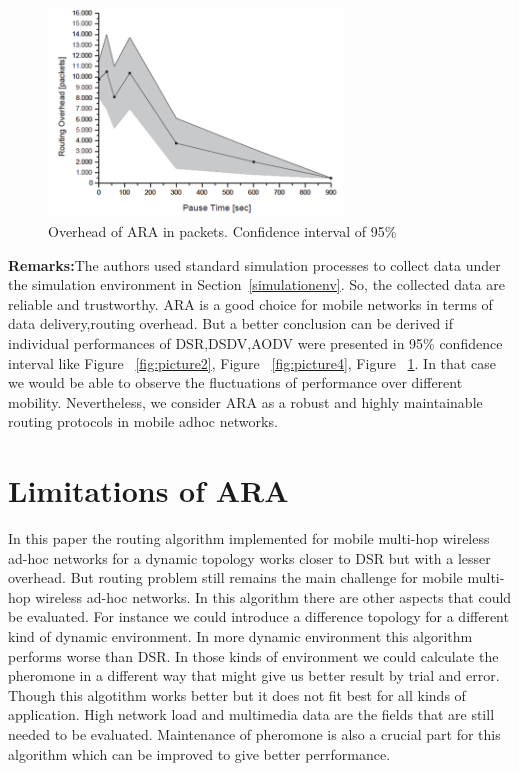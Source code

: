 \begin{figure}[t!]
\centering
\includegraphics[width=0.7\textwidth]{Picture6.png}
\caption{\label{fig:picture6}Overhead of ARA in packets. Confidence interval of 95\%}
\end{figure}


\textbf{Remarks:}The authors used standard simulation processes to collect data under the simulation environment in Section~\ref{simulationenv}. So, the collected data are reliable and trustworthy. ARA is a good choice for mobile networks in terms of data delivery,routing overhead. But a better conclusion can be derived if individual performances of DSR,DSDV,AODV were presented in 95\% confidence interval like Figure ~\ref{fig:picture2}, Figure ~\ref{fig:picture4}, Figure ~\ref{fig:picture6}. In that case we would be able to observe the fluctuations of performance over different mobility. 
Nevertheless, we consider ARA as a robust and highly maintainable routing protocols in mobile adhoc networks. 

\section{Limitations of ARA}
In this paper the routing algorithm implemented for mobile multi-hop wireless ad-hoc networks for a dynamic topology works closer to DSR but with a lesser overhead. But routing problem still remains the main challenge for mobile multi-hop wireless ad-hoc networks. In this algorithm there are other aspects that could be evaluated. For instance we  could introduce a difference topology for a different kind of dynamic environment. In more dynamic environment this algorithm performs worse than DSR. In those kinds of environment we could calculate the pheromone in a different way that might give us better result by trial and error. Though this algotithm works better but it does not fit best for all kinds of application. High network load and multimedia data are the fields that are still needed to be evaluated. Maintenance of pheromone is also a crucial part for this algorithm which can be improved to give better perrformance.

